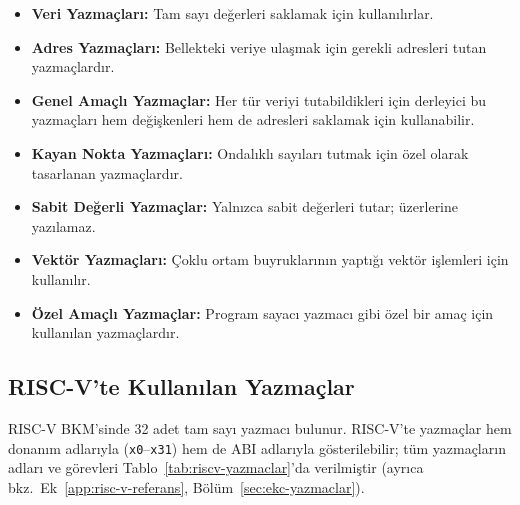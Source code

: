 \begin{itemize}
\item \textbf{Veri Yazmaçları:} Tam sayı değerleri saklamak için kullanılırlar.
\item \textbf{Adres Yazmaçları:} Bellekteki veriye ulaşmak için gerekli adresleri tutan yazmaçlardır.
\item \textbf{Genel Amaçlı Yazmaçlar:} Her tür veriyi tutabildikleri için derleyici bu yazmaçları hem değişkenleri hem de adresleri saklamak için kullanabilir.
\item \textbf{Kayan Nokta Yazmaçları:} Ondalıklı sayıları tutmak için özel olarak tasarlanan yazmaçlardır.
\item \textbf{Sabit Değerli Yazmaçlar:} Yalnızca sabit değerleri tutar; üzerlerine yazılamaz.
\item \textbf{Vektör Yazmaçları:} Çoklu ortam buyruklarının yaptığı vektör işlemleri için kullanılır.
\item \textbf{Özel Amaçlı Yazmaçlar:} Program sayacı yazmacı gibi özel bir amaç için kullanılan yazmaçlardır.
\end{itemize}

\subsection{RISC-V'te Kullanılan Yazmaçlar}

RISC-V BKM'sinde 32 adet tam sayı yazmacı bulunur. RISC-V'te yazmaçlar hem donanım adlarıyla (\texttt{x0}--\texttt{x31}) hem de ABI adlarıyla gösterilebilir; tüm yazmaçların adları ve görevleri Tablo~\ref{tab:riscv-yazmaclar}'da verilmiştir (ayrıca bkz.\ Ek~\ref{app:risc-v-referans}, Bölüm~\ref{sec:ekc-yazmaclar}).

